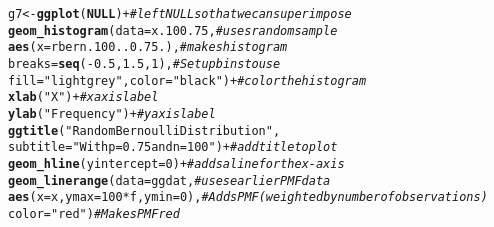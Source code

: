 \documentclass{article}\usepackage[]{graphicx}\usepackage[]{color}
\makeatletter
\newcommand{\hlnum}[1]{\textcolor[rgb]{0.686,0.059,0.569}{#1}}%
\newcommand{\hlstr}[1]{\textcolor[rgb]{0.192,0.494,0.8}{#1}}%
\newcommand{\hlcom}[1]{\textcolor[rgb]{0.678,0.584,0.686}{\textit{#1}}}%
\newcommand{\hlopt}[1]{\textcolor[rgb]{0,0,0}{#1}}%
\newcommand{\hlstd}[1]{\textcolor[rgb]{0.345,0.345,0.345}{#1}}%
\newcommand{\hlkwa}[1]{\textcolor[rgb]{0.161,0.373,0.58}{\textbf{#1}}}%
\newcommand{\hlkwb}[1]{\textcolor[rgb]{0.69,0.353,0.396}{#1}}%
\newcommand{\hlkwc}[1]{\textcolor[rgb]{0.333,0.667,0.333}{#1}}%
\newcommand{\hlkwd}[1]{\textcolor[rgb]{0.737,0.353,0.396}{\textbf{#1}}}%
\newenvironment{kframe}{%
 \def\at@end@of@kframe{}%
 \ifinner\ifhmode%
  \def\at@end@of@kframe{\end{minipage}}%
  \begin{minipage}{\columnwidth}%
 \fi\fi%
 \def\FrameCommand##1{\hskip\@totalleftmargin \hskip-\fboxsep
 \colorbox{shadecolor}{##1}\hskip-\fboxsep
     \hskip-\linewidth \hskip-\@totalleftmargin \hskip\columnwidth}%
 \MakeFramed {\advance\hsize-\width
   \@totalleftmargin\z@ \linewidth\hsize
   \@setminipage}}%
 {\par\unskip\endMakeFramed%
 \at@end@of@kframe}
\newenvironment{knitrout}{}{} %
\makeatother
\begin{document}
\begin{enumerate}
\begin{knitrout}
\begin{kframe}
\begin{alltt}
\hlstd{g7}\hlkwb{<-}\hlkwd{ggplot}\hlstd{(}\hlkwa{NULL}\hlstd{)} \hlopt{+}                                      \hlcom{#left NULL so that we can superimpose}
  \hlkwd{geom_histogram}\hlstd{(}\hlkwc{data}\hlstd{=x.100.75,}                         \hlcom{#uses random sample}
                 \hlkwd{aes}\hlstd{(}\hlkwc{x}\hlstd{=rbern.100..0.75.),}               \hlcom{#makes histogram}
                 \hlkwc{breaks}\hlstd{=}\hlkwd{seq}\hlstd{(}\hlopt{-}\hlnum{0.5}\hlstd{,}\hlnum{1.5}\hlstd{,}\hlnum{1}\hlstd{),}                \hlcom{#Set up bins to use}
                 \hlkwc{fill} \hlstd{=} \hlstr{"lightgrey"}\hlstd{,} \hlkwc{color}\hlstd{=}\hlstr{"black"}\hlstd{)} \hlopt{+}   \hlcom{#color the histogram}
  \hlkwd{xlab}\hlstd{(}\hlstr{"X"}\hlstd{)} \hlopt{+}                                           \hlcom{#x axis label}
  \hlkwd{ylab}\hlstd{(}\hlstr{"Frequency"}\hlstd{)}\hlopt{+}                                    \hlcom{#y axis label}
  \hlkwd{ggtitle}\hlstd{(}\hlstr{"Random Bernoulli Distribution"}\hlstd{,}
          \hlkwc{subtitle} \hlstd{=} \hlstr{"With p=0.75 and n=100"}\hlstd{)} \hlopt{+}         \hlcom{#add title to plot}
  \hlkwd{geom_hline}\hlstd{(}\hlkwc{yintercept}\hlstd{=}\hlnum{0}\hlstd{)} \hlopt{+}                            \hlcom{#adds a line for the x-axis}
  \hlkwd{geom_linerange}\hlstd{(}\hlkwc{data}\hlstd{=ggdat,}                            \hlcom{#uses earlier PMF data}
                 \hlkwd{aes}\hlstd{(}\hlkwc{x}\hlstd{=x,} \hlkwc{ymax}\hlstd{=}\hlnum{100}\hlopt{*}\hlstd{f,} \hlkwc{ymin}\hlstd{=}\hlnum{0}\hlstd{),}          \hlcom{#Adds PMF (weighted by number of observations)}
                 \hlkwc{color}\hlstd{=}\hlstr{"red"}\hlstd{)}                           \hlcom{#Makes PMF red}



\end{alltt}
\end{kframe}
\end{knitrout}
\end{enumerate}
\end{document}
